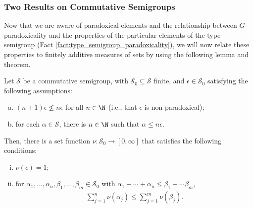 \documentclass[10pt]{mypackage2}
\begin{document}
\subsubsection{Two Results on Commutative Semigroups}%
Now that we are aware of paradoxical elements and the relationship between $G$-paradoxicality and the properties of the particular elements of the type semigroup (Fact \ref{fact:type_semigroup_paradoxicality}), we will now relate these properties to finitely additive measures of sets by using the following lemma and theorem.
\begin{lemma}\label{lemma:set_function_existence}
  Let $\mathcal{S}$ be a commutative semigroup, with $\mathcal{S}_0\subseteq \mathcal{S}$ finite, and $\epsilon\in \mathcal{S}_0$ satisfying the following assumptions:
  \begin{enumerate}[(a)]
    \item $\left(n+1\right)\epsilon \nleq n\epsilon$ for all $n\in \N$ (i.e., that $\epsilon$ is non-paradoxical);
    \item for each $\alpha\in \mathcal{S}$, there is $n\in \N$ such that $\alpha \leq n\epsilon$.
  \end{enumerate}
  Then, there is a set function $\nu\colon \mathcal{S}_0\rightarrow [0,\infty]$ that satisfies the following conditions:
  \begin{enumerate}[(i)]
    \item $\nu\left(\epsilon\right) = 1$;
    \item for $\alpha_1,\dots,\alpha_n,\beta_1,\dots,\beta_m\in \mathcal{S}_0$ with $\alpha_1+\cdots+\alpha_n\leq \beta_1+\cdots\beta_m$,
      \begin{align*}
        \sum_{j=1}^{n}\nu\left(\alpha_j\right) \leq \sum_{j=1}^{m}\nu\left(\beta_j\right).
      \end{align*}
  \end{enumerate}
\end{lemma}
\end{document}
